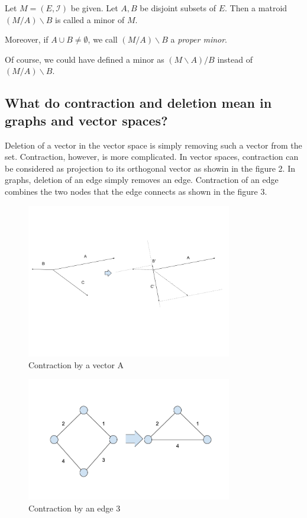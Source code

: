 \begin{defn}
Let $M = (E, \mathcal{I})$ be given.
Let $A, B$ be disjoint subsets of $E$.
Then a matroid $(M / A) \backslash B$ is called a minor of $M$.
\end{defn}

Moreover, if $A \cup B \neq \emptyset$, we call $(M / A) \backslash B$ a \textit{proper minor}.

Of course, we could have defined a minor as $(M \backslash A) / B$ instead of $(M / A) \backslash B$.


\subsection{What do contraction and deletion mean in graphs and vector spaces?}
Deletion of a vector in the vector space is simply removing such a vector from the set.
Contraction, however, is more complicated.
In vector spaces, contraction can be considered as projection to its orthogonal vector as showin in the figure 2.
In graphs, deletion of an edge simply removes an edge. Contraction of an edge combines the two nodes that the edge connects as shown in the figure 3.

\begin{figure}
  \centering
    \includegraphics[width=0.8\textwidth,natwidth=610,natheight=642]{vectors.png}
    \caption{Contraction by a vector A}
  \label{fig:test}
\end{figure}

\begin{figure}
  \centering
    \includegraphics[width=0.8\textwidth,natwidth=610,natheight=642]{graphs.png}
    \caption{Contraction by an edge 3}
  \label{fig:test}
\end{figure}



